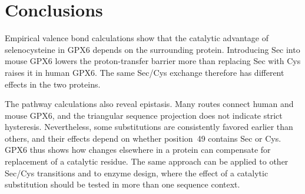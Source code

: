 \section{Conclusions}

Empirical valence bond calculations show that the catalytic advantage of selenocysteine in GPX6 depends on the surrounding protein. Introducing Sec into mouse GPX6 lowers the proton-transfer barrier more than replacing Sec with Cys raises it in human GPX6. The same Sec/Cys exchange therefore has different effects in the two proteins.

The pathway calculations also reveal epistasis. Many routes connect human and mouse GPX6, and the triangular sequence projection does not indicate strict hysteresis. Nevertheless, some substitutions are consistently favored earlier than others, and their effects depend on whether position~49 contains Sec or Cys. GPX6 thus shows how changes elsewhere in a protein can compensate for replacement of a catalytic residue. The same approach can be applied to other Sec/Cys transitions and to enzyme design, where the effect of a catalytic substitution should be tested in more than one sequence context.
